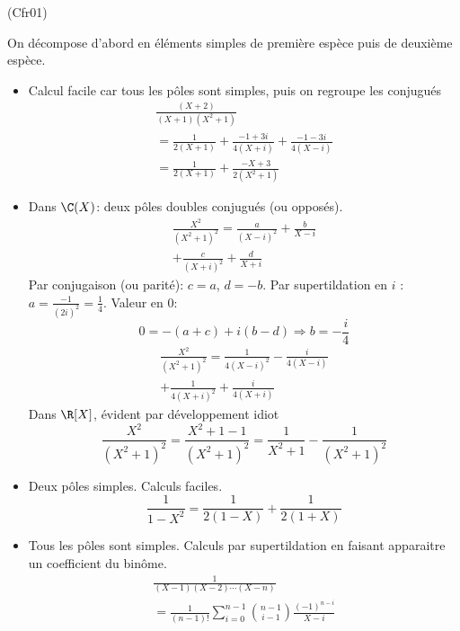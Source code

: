 \begin{tiny}(Cfr01)\end{tiny} On décompose d'abord en éléments simples de première espèce puis de deuxième espèce.
\begin{itemize}
 \item Calcul facile car tous les pôles sont simples, puis on regroupe les conjugués 
\begin{multline*}
\frac{(X+2)}{(X+1)(X^{2}+1)}\\
=\frac{1}{2(X+1)} +\frac{-1+3i}{4(X+i)} +\frac{-1-3i}{4(X-i)} \\
=\frac{1}{2(X+1)} + {\frac {-X+3}{2(X^{2}+1)}}
\end{multline*}

 \item Dans $\C(X)$: deux pôles doubles conjugués (ou opposés).
\begin{multline*}
\frac{X^2}{(X^2+1)^2}= \frac{a}{(X-i)^2} + \frac{b}{X-i} \\
+ \frac{c}{(X+i)^2} + \frac{d}{X+i}
\end{multline*}
Par conjugaison (ou parité): $c=a$, $d=-b$. Par supertildation en $i$ :$a=\frac{-1}{(2i)^2}=\frac{1}{4}$.\newline
Valeur en $0$:
\begin{displaymath}
 0= -(a+c)+i(b-d) \Rightarrow b=-\frac{i}{4}
\end{displaymath}
\begin{multline*}
\frac{X^2}{(X^2+1)^2}= \frac{1}{4(X-i)^2} - \frac{i}{4(X-i)} \\
+ \frac{1}{4(X+i)^2} + \frac{i}{4(X+i)}
\end{multline*}
Dans $\R[X]$, évident par développement idiot
\begin{displaymath}
 \frac{X^2}{(X^2+1)^2}=\frac{X^2+1-1}{(X^2+1)^2}=\frac{1}{X^2+1}-\frac{1}{(X^2+1)^2}
\end{displaymath}

 \item Deux pôles simples. Calculs faciles.
\begin{displaymath}
 \frac{1}{1-X^{2}}=\frac{1}{2(1-X)}+\frac{1}{2(1+X)}
\end{displaymath}

 \item Tous les pôles sont simples. Calculs par supertildation en faisant apparaitre un coefficient du binôme.
\begin{multline*}
\frac{1}{(X-1)(X-2)\cdots (X-n)}\\
=\frac{1}{(n-1)!}\sum_{i=0}^{n-1}\binom{n-1}{i-1}\frac{(-1)^{n-i}}{X-i}
\end{multline*}


\end{itemize}
